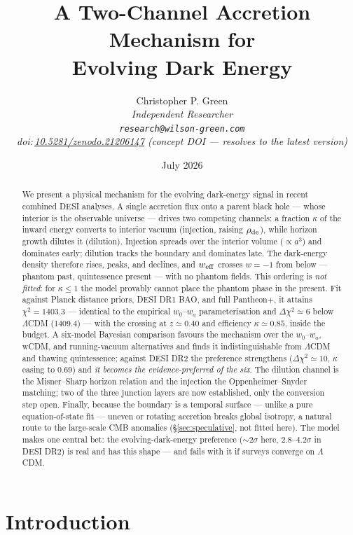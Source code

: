 \documentclass[11pt,a4paper]{article}
\title{\bfseries A Two-Channel Accretion Mechanism for\\ Evolving Dark Energy}
\author{Christopher P. Green\\[2pt]
\normalsize\itshape Independent Researcher\\[2pt]
\normalsize\upshape\texttt{research@wilson-green.com}\\[4pt]
\normalsize doi:\,\href{https://doi.org/10.5281/zenodo.21206147}{10.5281/zenodo.21206147} \normalsize\upshape(concept DOI --- resolves to the latest version)}
\date{July 2026}
\newcommand{\lcdm}{\ensuremath{\Lambda}CDM}
\newcommand{\weff}{w_{\rm eff}}
\begin{document}
\maketitle

\begin{abstract}
\noindent
We present a physical mechanism for the evolving dark-energy signal in recent combined DESI analyses. A single accretion flux onto a parent black hole --- whose interior is the observable universe --- drives two competing channels: a fraction $\kappa$ of the inward energy converts to interior vacuum (injection, raising $\rho_{\rm de}$), while horizon growth dilutes it (dilution). Injection spreads over the interior volume ($\propto a^3$) and dominates early; dilution tracks the boundary and dominates late. The dark-energy density therefore rises, peaks, and declines, and $\weff$ crosses $w=-1$ from below --- phantom past, quintessence present --- with no phantom fields. This ordering is \emph{not fitted}: for $\kappa\le1$ the model provably cannot place the phantom phase in the present. Fit against Planck distance priors, DESI DR1 BAO, and full Pantheon+, it attains $\chi^2=1403.3$ --- identical to the empirical $w_0$--$w_a$ parameterisation and $\Delta\chi^2\simeq6$ below \lcdm{} (1409.4) --- with the crossing at $z\simeq0.40$ and efficiency $\kappa\simeq0.85$, inside the budget. A six-model Bayesian comparison favours the mechanism over the $w_0$--$w_a$, wCDM, and running-vacuum alternatives and finds it indistinguishable from \lcdm{} and thawing quintessence; against DESI DR2 the preference strengthens ($\Delta\chi^2\simeq10$, $\kappa$ easing to $0.69$) and \emph{it becomes the evidence-preferred of the six}. The dilution channel is the Misner--Sharp horizon relation and the injection the Oppenheimer--Snyder matching; two of the three junction layers are now established, only the conversion step open. Finally, because the boundary is a temporal surface --- unlike a pure equation-of-state fit --- uneven or rotating accretion breaks global isotropy, a natural route to the large-scale CMB anomalies (\S\ref{sec:speculative}, not fitted here). The model makes one central bet: the evolving-dark-energy preference ($\sim2\sigma$ here, $2.8$--$4.2\sigma$ in DESI DR2) is real and has this shape --- and fails with it if surveys converge on \lcdm{}.
\end{abstract}

\section{Introduction}\label{sec:intro}
\end{document}
